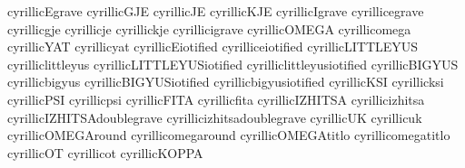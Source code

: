 
 cyrillicEgrave             {}
 cyrillicGJE                {}
 cyrillicJE                 {}
 cyrillicKJE                {}
 cyrillicIgrave             {}
 cyrillicegrave             {}
 cyrillicgje                {}
 cyrillicje                 {}
 cyrillickje                {}
 cyrillicigrave             {}
 cyrillicOMEGA              {}
 cyrillicomega              {}
 cyrillicYAT                {}
 cyrillicyat                {}
 cyrillicEiotified          {}
 cyrilliceiotified          {}
 cyrillicLITTLEYUS          {}
 cyrilliclittleyus          {}
 cyrillicLITTLEYUSiotified  {}
 cyrilliclittleyusiotified  {}
 cyrillicBIGYUS             {}
 cyrillicbigyus             {}
 cyrillicBIGYUSiotified     {}
 cyrillicbigyusiotified     {}
 cyrillicKSI                {}
 cyrillicksi                {}
 cyrillicPSI                {}
 cyrillicpsi                {}
 cyrillicFITA               {}
 cyrillicfita               {}
 cyrillicIZHITSA            {}
 cyrillicizhitsa            {}
 cyrillicIZHITSAdoublegrave {}
 cyrillicizhitsadoublegrave {}
 cyrillicUK                 {}
 cyrillicuk                 {}
 cyrillicOMEGAround         {}
 cyrillicomegaround         {}
 cyrillicOMEGAtitlo         {}
 cyrillicomegatitlo         {}
 cyrillicOT                 {}
 cyrillicot                 {}
 cyrillicKOPPA              {}
